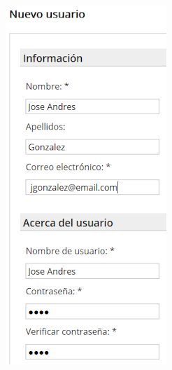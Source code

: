 \documentclass{article}
\begin{document}
\begin{itemize}
\begin{center}
\begin{figure}[h!]
\begin{subfigure}[!]{0.25\textwidth}
            \includegraphics[width=\textwidth]{images/jose.png}

\end{subfigure}
\end{figure}
\end{center}
\end{itemize}
\end{document}

